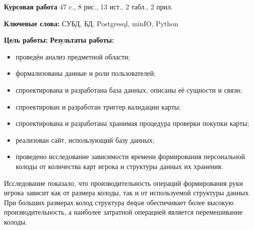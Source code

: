 
\textbf{Курсовая работа} 47 c., 8 рис., 13 ист., 2 табл., 2 прил.

\textbf{Ключевые слова:} СУБД, БД, Postgresql, minIO, Python

\textbf{Цель работы:}
\textbf{Результаты работы:}

\begin{itemize}
	\item проведён анализ предметной области;
	\item формализованы данные и роли пользователей;
	\item спроектирована и разработана база данных, описаны её сущности и
	      связи;
	\item спроектирован и разработан триггер валидации карты;
	\item спроектирована и разработана хранимая процедура проверки покупки
	      карты;
	\item реализован сайт, использующий базу данных;
	\item проведено исследование зависимости времени формирования
	      персональной колоды от количества карт игрока и структуры данных
	      их хранения.
\end{itemize}

Исследование показало, что производительность операций формирования руки игрока
зависит как от размера колоды, так и от используемой структуры данных. При
больших размерах колод структура \texttt{deque} обеспечивает более высокую
производительность, а наиболее затратной операцией является перемешивание
колоды.
\clearpage
